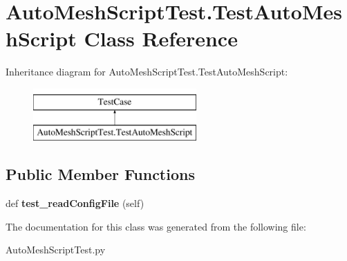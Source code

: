 \hypertarget{a00813}{}\section{Auto\+Mesh\+Script\+Test.\+Test\+Auto\+Mesh\+Script Class Reference}
\label{a00813}
Inheritance diagram for Auto\+Mesh\+Script\+Test.\+Test\+Auto\+Mesh\+Script\+:\begin{figure}[H]
\begin{center}
\leavevmode
\includegraphics[height=2.000000cm]{a00813}
\end{center}
\end{figure}
\subsection*{Public Member Functions}
\begin{DoxyCompactItemize}
\item 
\mbox{\label{a00813_a2cc528646d27cd467ac8b8c22a049aa8}} 
def {\bfseries test\+\_\+read\+Config\+File} (self)
\end{DoxyCompactItemize}


The documentation for this class was generated from the following file\+:\begin{DoxyCompactItemize}
\item 
Auto\+Mesh\+Script\+Test.\+py\end{DoxyCompactItemize}
